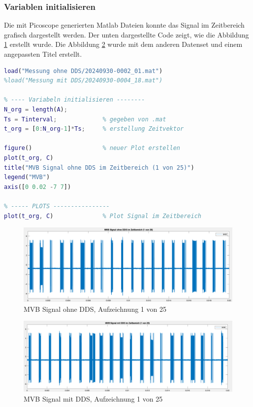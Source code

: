 \subsubsection{Variablen initialisieren}
Die mit Picoscope generierten Matlab Dateien konnte das Signal im Zeitbereich grafisch dargestellt werden. Der unten dargestellte Code zeigt, wie die Abbildung \ref{fig:MvbOhneDds} erstellt wurde. Die Abbildung \ref{fig:MvbMitDds} wurde mit dem anderen Datenset und einem angepassten Titel erstellt. 

\begin{lstlisting}[language=Matlab]
load("Messung ohne DDS/20240930-0002_01.mat")
%load("Messung mit DDS/20240930-0004_18.mat")

% ---- Variabeln initialisieren --------
N_org = length(A);          
Ts = Tinterval;             % gegeben von .mat
t_org = [0:N_org-1]*Ts;     % erstellung Zeitvektor

figure()                    % neuer Plot erstellen
plot(t_org, C)
title("MVB Signal ohne DDS im Zeitbereich (1 von 25)")
legend("MVB")
axis([0 0.02 -7 7])

% ----- PLOTS ----------------
plot(t_org, C)              % Plot Signal im Zeitbereich
\end{lstlisting}

\begin{figure}[H]
    \centering
    \includegraphics[width=0.8\linewidth]{Figures/Chap3/Busauslastung/MVB_Signal_ohneDDS.png}
    \caption{MVB Signal ohne DDS, Aufzeichnung 1 von 25}
    \label{fig:MvbOhneDds}
\end{figure}

\begin{figure}[H]
    \centering
    \includegraphics[width=0.8\linewidth]{Figures/Chap3/Busauslastung/MVB_Signal_mitDDS.png}
    \caption{MVB Signal mit DDS, Aufzeichnung 1 von 25}
    \label{fig:MvbMitDds}
\end{figure}

